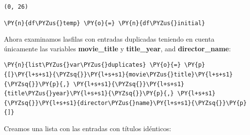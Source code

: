             \begin{tcolorbox}[breakable, boxrule=.5pt, size=fbox, pad at break*=1mm, opacityfill=0]
\begin{Verbatim}[commandchars=\\\{\}]
(0, 26)
\end{Verbatim}
\end{tcolorbox}
        
    \begin{tcolorbox}[breakable, size=fbox, boxrule=1pt, pad at break*=1mm,colback=cellbackground, colframe=cellborder]
\begin{Verbatim}[commandchars=\\\{\}]
\PY{n}{df\PYZus{}temp} \PY{o}{=} \PY{n}{df\PYZus{}initial}
\end{Verbatim}
\end{tcolorbox}

    Ahora examinamos lasfilas con entradas duplicadas teniendo en cuenta
únicamente las variables \textbf{movie\_title} y \textbf{title\_year},
and \textbf{director\_name}:

    \begin{tcolorbox}[breakable, size=fbox, boxrule=1pt, pad at break*=1mm,colback=cellbackground, colframe=cellborder]
\begin{Verbatim}[commandchars=\\\{\}]
\PY{n}{list\PYZus{}var\PYZus{}duplicates} \PY{o}{=} \PY{p}{[}\PY{l+s+s1}{\PYZsq{}}\PY{l+s+s1}{movie\PYZus{}title}\PY{l+s+s1}{\PYZsq{}}\PY{p}{,} \PY{l+s+s1}{\PYZsq{}}\PY{l+s+s1}{title\PYZus{}year}\PY{l+s+s1}{\PYZsq{}}\PY{p}{,} \PY{l+s+s1}{\PYZsq{}}\PY{l+s+s1}{director\PYZus{}name}\PY{l+s+s1}{\PYZsq{}}\PY{p}{]}
\end{Verbatim}
\end{tcolorbox}

    Creamos una lista con las entradas con títulos idénticos:

